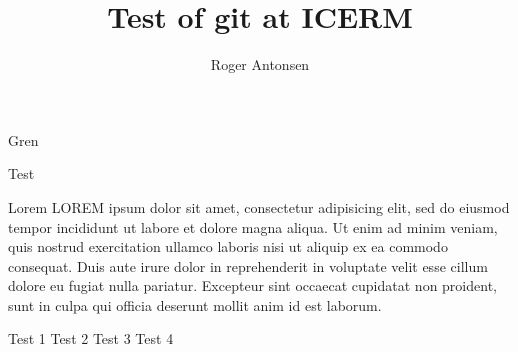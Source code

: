 \documentclass[12pt,a4paper]{article}
\author{Roger Antonsen}
\title{Test of git at ICERM}
\begin{document}
\maketitle

Gren

Test

Lorem LOREM ipsum dolor sit amet, consectetur adipisicing elit, sed do eiusmod tempor incididunt ut labore et dolore magna aliqua. Ut enim ad minim veniam, quis nostrud exercitation ullamco laboris nisi ut aliquip ex ea commodo consequat. Duis aute irure dolor in reprehenderit in voluptate velit esse cillum dolore eu fugiat nulla pariatur. Excepteur sint occaecat cupidatat non proident, sunt in culpa qui officia deserunt mollit anim id est laborum.

Test 1
Test 2
Test 3
Test 4
\end{document}

